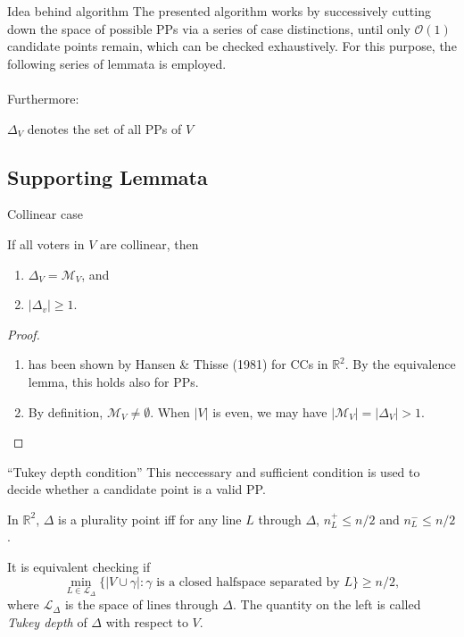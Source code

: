 \documentclass{beamer}
\newcommand{\RR}{\mathbb{R}}
\newcommand{\order}[1]{\ensuremath{\mathcal{O}(#1)}}
\newcommand{\eqspacing}[2]{%
  \setlength\abovedisplayskip{#1}%
  \setlength\belowdisplayskip{#2}%
}
\begin{document}
\begin{frame}{Idea behind algorithm}
  The presented algorithm works by successively cutting down the space of possible PPs via a series
  of case distinctions, until only \order{1} candidate points remain, which can be checked
  exhaustively. For this purpose, the following series of lemmata is employed. \\~\\

  Furthermore:
  \begin{definition}[]
    \(\Delta_V\) denotes the set of all PPs of \(V\)
  \end{definition}
\end{frame}


\subsection{Supporting Lemmata}

\begin{frame}{Collinear case} 
  \begin{lemma} %
    If all voters in \(V\) are collinear, then
    \begin{enumerate}
    \item \(\Delta_V = \mathcal{M}_V\), and
    \item \(\lvert\Delta_{v}\rvert \geq 1\).
    \end{enumerate}
  \end{lemma}
  \begin{proof}
    \begin{enumerate}
    \item has been shown by Hansen \& Thisse (1981) for CCs in \(\RR^2\). By the
      equivalence lemma, this holds also for PPs.
    \item By definition, \(\mathcal{M}_V \neq \emptyset\). When \(\lvert V\rvert\) is even, we may
      have \(\lvert\mathcal{M}_V\rvert = \lvert\Delta_V\rvert > 1\).
    \end{enumerate}
\end{proof}
\end{frame}


\begin{frame}{\enquote{Tukey depth condition}}
  This neccessary and sufficient condition is used to decide whether a candidate point is a valid
  PP.
  \begin{lemma}[]  %
    In \(\RR^2\), \(\Delta\) is a plurality point iff for any line \(L\) through \(\Delta\), \(n^+_L
    \leq n/2\) and \(n^-_L \leq n/2\). 
  \end{lemma}
  \eqspacing{1ex}{1ex}
  It is equivalent checking if
  \begin{equation*}
    \min_{L \in \mathcal{L}_{\Delta}} \{\lvert V \cup \gamma \rvert : \text{\(\gamma\) is a closed halfspace
      separated by \(L\)}\} \geq n/2,
  \end{equation*}
  where \(\mathcal{L}_{\Delta}\) is the space of lines through \(\Delta\). The quantity on the left
  is called \textit{Tukey depth} of \(\Delta\) with respect to \(V\).
\end{frame}
\end{document}
